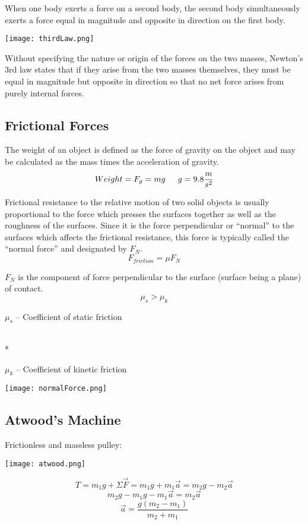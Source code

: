 \documentclass{article}
\begin{document}
  		When one body exerts a force on a second body, the second body simultaneously exerts a force equal in magnitude and opposite in direction on the first body.
  		\begin{multicols}{2}
  			\centerline{\texttt{[image: thirdLaw.png]}}
  		\columnbreak
  			Without specifying the nature or origin of the forces on the two masses, Newton's 3rd law states that if they arise from the two masses themselves, they must be equal in magnitude but opposite in direction so that no net force arises from purely internal forces.
  		\end{multicols}
  
  	\subsection{Frictional Forces}
  
  		The weight of an object is defined as the force of gravity on the object and may be calculated as the mass times the acceleration of gravity.
  		\[
        	Weight=F_g=mg \indent g=9.8\frac{m}{s^2}
        \]
  
  		Frictional resistance to the relative motion of two solid objects is usually proportional to the force which presses the surfaces together as well as the roughness of the surfaces. Since it is the force perpendicular or ``normal'' to the surfaces which affects the frictional resistance, this force is typically called the ``normal force'' and designated by $F_N$.
  		\[
        	F_{friction}=\mu F_N
        \]
  		\begin{multicols}{2}
  			\noindent$F_N$ is the component of force perpendicular to the surface (surface being a plane) of contact.
  			\[
            	\mu_s>\mu_k
            \]
  			\centerline{$\mu_s$ -- Coefficient of static friction}\\*
  			\centerline{$\mu_k$ -- Coefficient of kinetic friction}
  		\columnbreak
  			\centerline{\texttt{[image: normalForce.png]}}
  		\end{multicols}
  
  	\subsection{Atwood's Machine}
  		Frictionless and massless pulley:
  
  		\begin{multicols}{2}
  			\centerline{\texttt{[image: atwood.png]}}
  		\columnbreak
  			\[
            	T=m_1g+\Sigma\vec{F}=m_1g+m_1\vec{a}=m_2g-m_2\vec{a}
            \]
  			\[
            	m_2g-m_1g-m_1\vec{a}=m_2\vec{a}
            \]
  			\[
            	\vec{a}=\frac{g(m_2-m_1)}{m_2+m_1}
            \]
  		\end{multicols}
  
\end{document}

